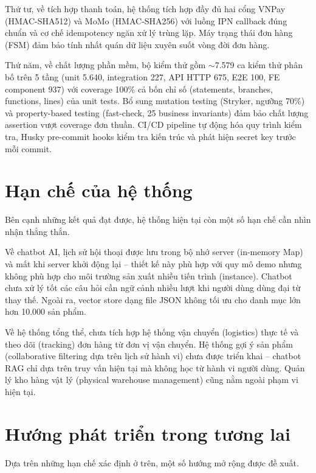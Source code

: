 Thứ tư, về tích hợp thanh toán, hệ thống tích hợp đầy đủ hai cổng VNPay (HMAC-SHA512) và MoMo (HMAC-SHA256) với luồng IPN callback đúng chuẩn và cơ chế idempotency ngăn xử lý trùng lặp. Máy trạng thái đơn hàng (FSM) đảm bảo tính nhất quán dữ liệu xuyên suốt vòng đời đơn hàng.

Thứ năm, về chất lượng phần mềm, bộ kiểm thử gồm $\sim$7.579 ca kiểm thử phân bố trên 5 tầng (unit 5.640, integration 227, API HTTP 675, E2E 100, FE component 937) với coverage 100\% cả bốn chỉ số (statements, branches, functions, lines) của unit tests. Bổ sung mutation testing (Stryker, ngưỡng 70\%) và property-based testing (fast-check, 25 business invariants) đảm bảo chất lượng assertion vượt coverage đơn thuần. CI/CD pipeline tự động hóa quy trình kiểm tra, Husky pre-commit hooks kiểm tra kiến trúc và phát hiện secret key trước mỗi commit.

\section*{Hạn chế của hệ thống}

Bên cạnh những kết quả đạt được, hệ thống hiện tại còn một số hạn chế cần nhìn nhận thẳng thắn.

Về chatbot AI, lịch sử hội thoại được lưu trong bộ nhớ server (in-memory Map) và mất khi server khởi động lại -- thiết kế này phù hợp với quy mô demo nhưng không phù hợp cho môi trường sản xuất nhiều tiến trình (instance). Chatbot chưa xử lý tốt các câu hỏi cần ngữ cảnh nhiều lượt khi người dùng dùng đại từ thay thế. Ngoài ra, vector store dạng file JSON không tối ưu cho danh mục lớn hơn 10.000 sản phẩm.

Về hệ thống tổng thể, chưa tích hợp hệ thống vận chuyển (logistics) thực tế và theo dõi (tracking) đơn hàng từ đơn vị vận chuyển. Hệ thống gợi ý sản phẩm (collaborative filtering dựa trên lịch sử hành vi) chưa được triển khai -- chatbot RAG chỉ dựa trên truy vấn hiện tại mà không học từ hành vi người dùng. Quản lý kho hàng vật lý (physical warehouse management) cũng nằm ngoài phạm vi hiện tại.

\section*{Hướng phát triển trong tương lai}

Dựa trên những hạn chế xác định ở trên, một số hướng mở rộng được đề xuất.

